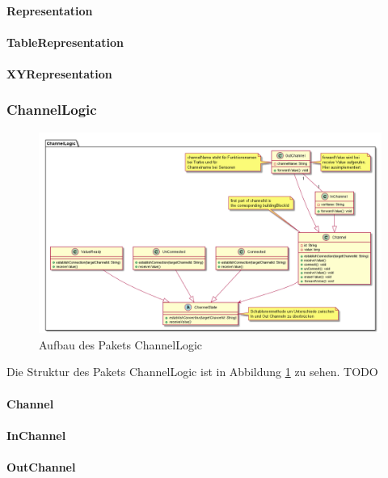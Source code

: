 \documentclass[parskip=full]{scrartcl}
\begin{document}
\paragraph{Representation}
\paragraph{TableRepresentation}
\paragraph{XYRepresentation}


\subsubsection{ChannelLogic}

\begin{figure}[htbp]
	\begin{center}
		\includegraphics[width = 16cm]{Grafiken/ChannelLogic.png}
		\caption{Aufbau des Pakets ChannelLogic}
		\label{ChannelLogic}
	\end{center}
\end{figure}

Die Struktur des Pakets ChannelLogic ist in Abbildung \ref{ChannelLogic} zu sehen.
TODO


\paragraph{Channel}
\paragraph{InChannel}
\paragraph{OutChannel}
\end{document}
